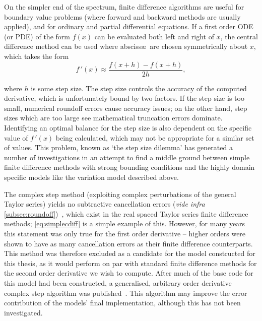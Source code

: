On the simpler end of the spectrum, finite difference algorithms are useful for boundary value problems (where forward and backward methods are usually applied), and for ordinary and partial differential equations.
If a first order ODE (or PDE) of the form $f(x)$ can be evaluated both left and right of $x$, the central difference method can be used where absciss\ae\ are chosen symmetrically about $x$, which takes the form
\begin{equation}
f\,'(x) \approx \frac{f(x+h)-f(x+h)}{2h},\label{eq:simplecdiff}
\end{equation}

where $h$ is some step size.
The step size controls the accuracy of the computed derivative, which is unfortunately bound by two factors.
If the step size is too small, numerical roundoff errors cause accuracy issues; on the other hand, step sizes which are too large see mathematical truncation errors dominate.
Identifying an optimal balance for the step size is also dependent on the specific value of $f\,'(x)$ being calculated, which may not be appropriate for a similar set of values.
This problem, known as `the step size dilemma' has generated a number of investigations in an attempt to find a middle ground between simple finite difference methods with strong bounding conditions and the highly domain specific models like the variation model described above.

The complex step method (exploiting complex perturbations of the general Taylor series) yields no subtractive cancellation errors (\textit{vide infra} \cref{subsec:roundoff})~\cite{Squire1998}, which exist in the real spaced Taylor series finite difference methods; \cref{eq:simplecdiff} is a simple example of this.
However, for many years this statement was only true for the first order derivative -- higher orders were shown to have as many cancellation errors as their finite difference counterparts.
This method was therefore excluded as a candidate for the model constructed for this thesis, as it would perform on par with standard finite difference methods for the second order derivative we wish to compute.
After much of the base code for this model had been constructed, a generalised, arbitrary order derivative complex step algorithm was published~\cite{Lantoine2012}.
This algorithm may improve the error contribution of the models' final implementation, although this has not been investigated.


